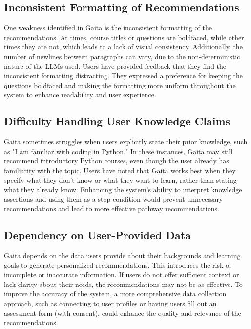 \subsection{Inconsistent Formatting of Recommendations}

One weakness identified in Gaita is the inconsistent formatting of the recommendations. At times, course titles or questions are boldfaced, while other times they are not, which leads to a lack of visual consistency. Additionally, the number of newlines between paragraphs can vary, due to the non-deterministic nature of the LLMs used. Users have provided feedback that they find the inconsistent formatting distracting. They expressed a preference for keeping the questions boldfaced and making the formatting more uniform throughout the system to enhance readability and user experience.

\subsection{Difficulty Handling User Knowledge Claims}

Gaita sometimes struggles when users explicitly state their prior knowledge, such as "I am familiar with coding in Python." In these instances, Gaita may still recommend introductory Python courses, even though the user already has familiarity with the topic. Users have noted that Gaita works best when they specify what they don't know or what they want to learn, rather than stating what they already know. Enhancing the system’s ability to interpret knowledge assertions and using them as a stop condition would prevent unnecessary recommendations and lead to more effective pathway recommendations.

\subsection{Dependency on User-Provided Data}

Gaita depends on the data users provide about their backgrounds and learning goals to generate personalized recommendations. This introduces the risk of incomplete or inaccurate information. If users do not offer sufficient context or lack clarity about their needs, the recommendations may not be as effective. To improve the accuracy of the system, a more comprehensive data collection approach, such as connecting to user profiles or having users fill out an assessment form (with consent), could enhance the quality and relevance of the recommendations.

